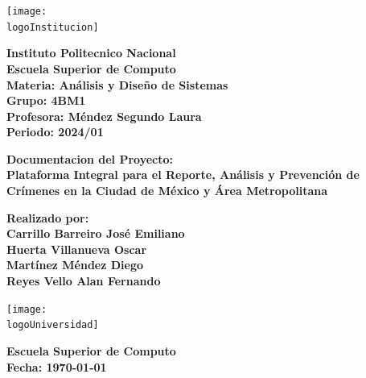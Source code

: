 \documentclass{article}
\newcommand{\logoInstitucion}{logotipo_ipn.png} %
\newcommand{\logoUniversidad}{EscudoESCOM.png} %
\newcommand{\nombreInstituto}{Instituto Politecnico Nacional}
\newcommand{\facultad}{Escuela Superior de Computo}
\newcommand{\materia}{Análisis y Diseño de Sistemas}
\newcommand{\grupo}{4BM1}
\newcommand{\profesora}{Méndez Segundo Laura}
\newcommand{\periodo}{2024/01}
\newcommand{\alumno}{Carrillo Barreiro José Emiliano}
\begin{document}
\begin{titlepage}
    \begin{center}
        \vspace*{1cm}

        \texttt{[image: \\logoInstitucion]}

        \vspace{1cm}

        \textbf{\LARGE \nombreInstituto} \\
        \textbf{\Large \facultad} \\
        \vspace{0.5cm}
        \textbf{\large Materia: \materia} \\
        \textbf{\large Grupo: \grupo} \\
        \vspace{0.5cm}
        \textbf{\large Profesora: \profesora} \\
        \textbf{\large Periodo: \periodo} \\

        \vspace{1cm}

        \textbf{\LARGE Documentacion del Proyecto:} \\
        \vspace{0.5cm}
        \textbf{\Large Plataforma Integral para el Reporte, Análisis y Prevención de Crímenes en la Ciudad de México y Área Metropolitana} \\

        \vfill

        \textbf{\large Realizado por:} \\
        \textbf{\large \alumno \\Huerta Villanueva Oscar  \\Martínez Méndez Diego  \\Reyes Vello Alan Fernando }

        \vspace{1cm}

        \texttt{[image: \\logoUniversidad]}

        \vspace{1cm}

        \textbf{\large \facultad} \\
        \textbf{\large Fecha: \today}

    \end{center}
\end{titlepage}
\end{document}
